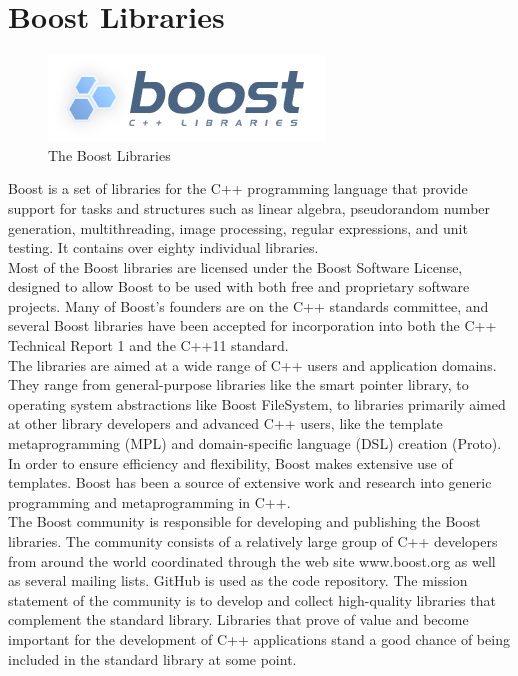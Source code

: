\section{Boost Libraries}
\begin{figure}[H]
    \centering \includegraphics[width=0.7\linewidth]{images/boost.png}
    \caption{The Boost Libraries}
\end{figure}
Boost is a set of libraries for the C++ programming language that provide support for tasks and structures such as linear algebra, pseudorandom number generation, multithreading, image processing, regular expressions, and unit testing. It contains over eighty individual libraries.\\
Most of the Boost libraries are licensed under the Boost Software License, designed to allow Boost to be used with both free and proprietary software projects. Many of Boost's founders are on the C++ standards committee, and several Boost libraries have been accepted for incorporation into both the C++ Technical Report 1 and the C++11 standard.\\
The libraries are aimed at a wide range of C++ users and application domains. They range from general-purpose libraries like the smart pointer library, to operating system abstractions like Boost FileSystem, to libraries primarily aimed at other library developers and advanced C++ users, like the template metaprogramming (MPL) and domain-specific language (DSL) creation (Proto).\\
In order to ensure efficiency and flexibility, Boost makes extensive use of templates. Boost has been a source of extensive work and research into generic programming and metaprogramming in C++.\\
The Boost community is responsible for developing and publishing the Boost libraries. The community consists of a relatively large group of C++ developers from around the world coordinated through the web site www.boost.org as well as several mailing lists. GitHub is used as the code repository. The mission statement of the community is to develop and collect high-quality libraries that complement the standard library. Libraries that prove of value and become important for the development of C++ applications stand a good chance of being included in the standard library at some point.

